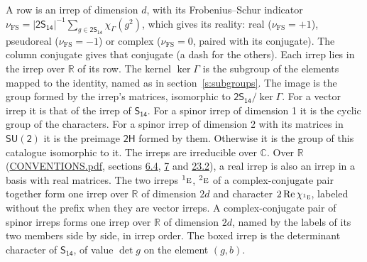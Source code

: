 \documentclass[10pt,a4paper]{article}
\numberwithin{equation}{section}
\newcommand{\grp}[1]{\mathsf{#1}}
\newcommand{\irr}[1]{\text{\normalfont\scshape #1}}
\newcommand{\conjpair}[1]{{}^{#1}}
\newcommand{\irchar}[1]{\chi_{#1}}
\newcommand{\fsind}{\nu_{\mathrm{FS}}}
\begin{document}
\leavevmode\label{n:index.frobenius}\label{n:head.irrep}\label{n:head.reality}A row is an irrep of dimension $d$, with its Frobenius--Schur indicator $\fsind = |\grp{2S_{14}}|^{-1}\allowbreak\sum_{g\in\grp{2S_{14}}}\irchar{\Gamma}(g^2)$, which gives its reality: real ($\fsind = +1$), pseudoreal ($\fsind = -1$) or complex ($\fsind = 0$, paired with its conjugate). \label{n:head.conjugate}The column conjugate gives that conjugate (a dash for the others). \label{n:head.over.real}Each irrep lies in the irrep over $\mathbb{R}$ of its row. \label{n:head.kernel}The kernel $\ker\Gamma$ is the subgroup of the elements mapped to the identity, named as in section~\ref{s:subgroups}. \label{n:head.image}The image is the group formed by the irrep's matrices, isomorphic to $\grp{2S_{14}}/\ker\Gamma$. For a vector irrep it is that of the irrep of \href{../../../rotation/data/pdf/S14.pdf}{$\grp{S_{14}}$}. For a spinor irrep of dimension 1 it is the cyclic group of the characters. For a spinor irrep of dimension 2 with its matrices in $\grp{SU(2)}$ it is the preimage $\grp{2H}$ formed by them. Otherwise it is the group of this catalogue isomorphic to it. The irreps are irreducible over $\mathbb{C}$. Over $\mathbb{R}$ (\href{../../CONVENTIONS.pdf}{CONVENTIONS.pdf}, sections \href{../../../rotation/CONVENTIONS.pdf\#conv.6.4}{6.4}, \href{../../../rotation/CONVENTIONS.pdf\#conv.7}{7} and \href{../../CONVENTIONS.pdf\#conv.23.2}{23.2}), a real irrep is also an irrep in a basis with real matrices. The two irreps $\conjpair{1}\irr{e}$, $\conjpair{2}\irr{e}$ of a complex-conjugate pair together form one irrep over $\mathbb{R}$ of dimension $2d$ and character $2\operatorname{Re}\irchar{\conjpair{1}\irr{e}}$, labeled without the prefix when they are vector irreps. A complex-conjugate pair of spinor irreps forms one irrep over $\mathbb{R}$ of dimension $2d$, named by the labels of its two members side by side, in irrep order. \label{n:mark.determinant}The boxed irrep is the determinant character of \href{../../../rotation/data/pdf/S14.pdf}{$\grp{S_{14}}$}, of value $\det g$ on the element $(g, b)$.
\setlength{\emergencystretch}{2em}\par\setlength{\emergencystretch}{0pt}
\end{document}
